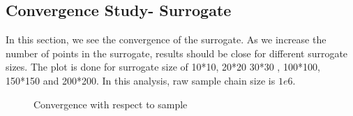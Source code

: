 \subsection{Convergence Study- Surrogate }

In this section, we see the convergence of the surrogate. As we increase the number of points in the surrogate, results should be close for different surrogate sizes. The plot is done for surrogate size of 10*10, 20*20 30*30 , 100*100, 150*150 and 200*200. In this analysis, raw sample chain size is $1e6$.

\begin{figure}[H]
\centering
{}
            \caption{Convergence with respect to sample}
\end{figure}

